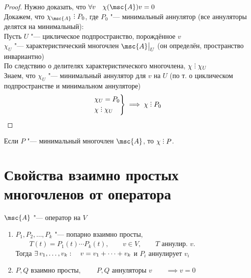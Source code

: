 \begin{proof}
	Нужно доказать, что $ \forall v \quad \chi(\msc{A})v = 0 $ \\
	Докажем, что $ \chi_{\msc{A}} \divby P_0 $, где $ P_0 $ "--- минимальный аннулятор (все аннуляторы делятся на минимальный): \\
	Пусть $ U $ "--- циклическое подпространство, порождённое $ v $ \\
	$ \chi_U $ "--- характеристический многочлен $ \msc{A}\clamp{U} $ (он определён, \as пространство инвариантно) \\
	По следствию о делителях характеристического многочлена, $ \chi \divby \chi_U $ \\
	Знаем, что $ \chi_U $ "--- минимальный аннулятор для $ v $ на $ U $ (по т. о циклическом подпространстве и минимальном аннуляторе)
	$$
	\begin{rcases}
		\chi_U = P_0 \\
		\chi \divby \chi_U
	\end{rcases} \implies \chi \divby P_0 $$
\end{proof}

\begin{implication}
	Если $ P $ "--- минимальный многочлен $ \msc{A} $, то $ \chi \divby P $.
\end{implication}

\section{Свойства взаимно простых многочленов от оператора}

\begin{properties}
	$ \msc{A} $ "--- оператор на $ V $
	\begin{enumerate}
		\item $ P_1, P_2, \dots, P_k $ "--- попарно взаимно просты, $ \qquad T(t) = P_1(t) \cdots P_k(t), \qquad v \in V, \qquad T $ аннулир. $ v $. \\
		Тогда $ \exists\, v_1, \dots, v_k : \quad v = v_1 + \dots + v_k $ и $ P_i $ аннулирует $ v_i $

		\item $ P, Q $ взаимно просты, $ \qquad P, Q $ аннуляторы $ v \qquad \implies v = 0 $
	\end{enumerate}
\end{properties}

